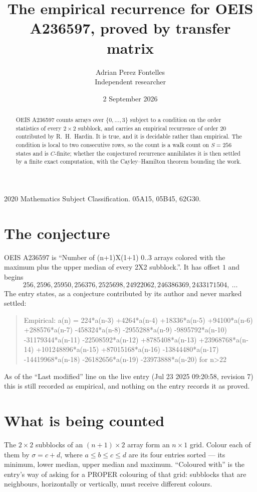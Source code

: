 \documentclass[11pt,a4paper]{article}
\title{The empirical recurrence for OEIS A236597, proved by transfer matrix}
\author{Adrian Perez Fontelles\\ \small Independent researcher}
\date{2 September 2026}
\theoremstyle{plain}
\theoremstyle{definition}
\begin{document}
\maketitle

\begin{abstract}
OEIS A236597 counts arrays over $\{0,\dots,3\}$ subject to a condition on the order
statistics of every $2\times2$ subblock, and carries an empirical recurrence of order
$20$ contributed by R.~H.~Hardin. It is true, and it is decidable rather than empirical.
The condition is local to two consecutive rows, so the count is a walk count on $S=256$
states and is $C$-finite; whether the conjectured recurrence annihilates it is then settled by
a finite exact computation, with the Cayley--Hamilton theorem bounding the work.
\end{abstract}

\noindent\small 2020 Mathematics Subject Classification. 05A15, 05B45, 62G30.\normalsize

\section{The conjecture}

OEIS A236597 is ``Number of (n+1)X(1+1) 0..3 arrays colored with the maximum plus the upper median of every 2X2 subblock.''. It has offset $1$ and begins
\[
256, 2596, 25950, 256376, 2525698, 24922062, 246386369, 2433171504,\ \dots
\]
The entry states, as a conjecture contributed by its author and never marked settled:
\begin{quote}
Empirical: a(n) = 224*a(n-3) +4264*a(n-4) +18336*a(n-5) +94100*a(n-6) +288576*a(n-7) -458324*a(n-8) -2955288*a(n-9) -9895792*a(n-10) -31179344*a(n-11) -22508592*a(n-12) +8785408*a(n-13) +23968768*a(n-14) +101248896*a(n-15) +87015168*a(n-16) -13844480*a(n-17) -14419968*a(n-18) -26182656*a(n-19) -23973888*a(n-20) for n>22
\end{quote}
As of the ``Last modified'' line on the live entry (Jul 23 2025 09:20:58, revision 7) this is still
recorded as empirical, and nothing on the entry records it as proved.

\section{What is being counted}

The $2\times2$ subblocks of an $(n+1)\times2$ array form an
$n\times1$ grid. Colour each of them by $\sigma=c+d$, where $a\le b\le c\le d$ are its four entries sorted --- its minimum, lower median, upper median and maximum. ``Coloured with'' is the entry's way of
asking for a PROPER colouring of that grid: subblocks that are neighbours, horizontally or
vertically, must receive different colours.
\end{document}
